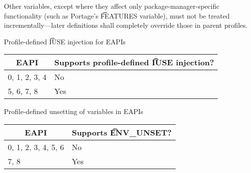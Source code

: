 Other variables, except where they affect only package-manager-specific functionality (such as
Portage's \t{FEATURES} variable), must not be treated incrementally---later definitions shall
completely override those in parent profiles.

\begin{centertable}{Profile-defined \t{IUSE} injection for EAPIs}
    \label{tab:profile-iuse-injection-table}
    \begin{tabular}{ll}
      \toprule
      \multicolumn{1}{c}{\textbf{EAPI}} &
      \multicolumn{1}{c}{\textbf{Supports profile-defined \t{IUSE} injection?}} \\
      \midrule
      0, 1, 2, 3, 4     & No  \\
      5, 6, 7, 8        & Yes \\
      \bottomrule
    \end{tabular}
\end{centertable}

\begin{centertable}{Profile-defined unsetting of variables in EAPIs}
    \label{tab:profile-env-unset}
    \begin{tabular}{ll}
      \toprule
      \multicolumn{1}{c}{\textbf{EAPI}} &
      \multicolumn{1}{c}{\textbf{Supports \t{ENV_UNSET}?}} \\
      \midrule
      0, 1, 2, 3, 4, 5, 6 & No  \\
      7, 8                & Yes \\
      \bottomrule
    \end{tabular}
\end{centertable}

